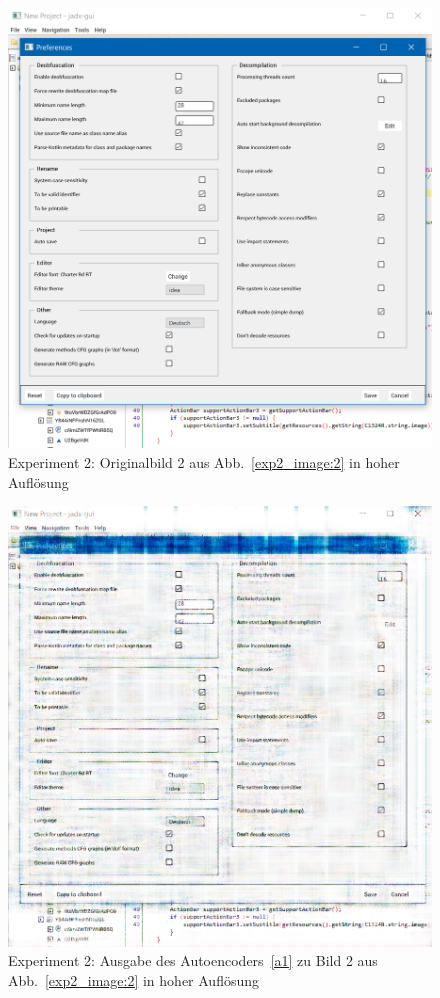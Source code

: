 \label{sec:appendix:exp2_2}
\begin{figure} [ht]
  \centering
  \includegraphics[width=\textwidth]{bilder/result_exp2/1.png}

  \caption{Experiment 2: Originalbild 2 aus Abb.~\ref{exp2_image:2} in hoher Auflösung}
\end{figure}

\begin{figure} [ht]
  \centering
  \includegraphics[width=\textwidth]{bilder/result_exp2/1_pred_a1.png}

  \caption{Experiment 2: Ausgabe des Autoencoders~\ref{a1} zu Bild 2 aus Abb.~\ref{exp2_image:2} in hoher Auflösung}
\end{figure}


